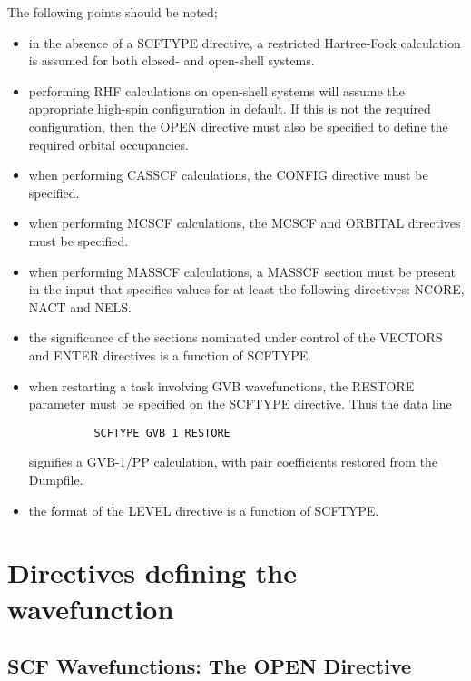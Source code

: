 \documentclass[11pt,fleqn]{article}
\begin{document}
The following points should be noted;
\begin{itemize}

\item  in the absence of a SCFTYPE directive, a restricted Hartree-Fock
calculation is assumed for both closed- and open-shell systems.
\item  performing RHF calculations on open-shell systems will assume
the appropriate high-spin configuration in default. If this is not the
required configuration, then the OPEN directive must also be specified
to define the required orbital occupancies.
\item  when performing CASSCF calculations, the CONFIG directive
must be specified.
\item  when performing MCSCF calculations, the MCSCF and ORBITAL
directives must be specified.
\item  when performing MASSCF calculations, a MASSCF section must be
  present in the input that specifies values for at least the following
  directives: NCORE, NACT and NELS.
\item  the significance of the sections nominated under control of
the VECTORS and ENTER directives is a function of SCFTYPE.
\item  when restarting a task involving GVB wavefunctions, the RESTORE
parameter must be specified on the SCFTYPE directive. Thus the data
line

{
\footnotesize
\begin{verbatim}
          SCFTYPE GVB 1 RESTORE
\end{verbatim}
}
signifies a GVB-1/PP calculation, with pair coefficients restored from
the Dumpfile.
\item  the format of the LEVEL directive is a function of SCFTYPE.
\end{itemize}

\section[Directives defining the wavefunction]{Directives defining the wavefunction}

\subsection[SCF Wavefunctions: The OPEN Directive]{SCF Wavefunctions: The OPEN Directive}
\end{document}
